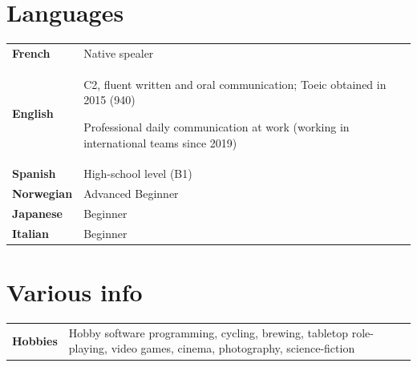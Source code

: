 \documentclass[11pt,a4paper]{article}
\newlength{\colone}
\newlength{\coltwo}
\begin{document}
\section{Languages}
\begin{longtable}{@{}p{\colone}p{\coltwo}@{}}
	\bfseries French	& Native spealer \\
	\bfseries English 	& C2, fluent written and oral communication; {\sc Toeic} obtained in 2015 (940) \par
		Professional daily communication at work (working in international teams since 2019) \\
	\bfseries Spanish 	& High-school level (B1) \\
	\bfseries Norwegian & Advanced Beginner \\
	\bfseries Japanese 	& Beginner \\
	\bfseries Italian 	& Beginner \\
\end{longtable}


\section{Various info}
\begin{longtable}{@{}p{\colone}p{\coltwo}@{}}
	\bfseries Hobbies
		& Hobby software programming, cycling, brewing, tabletop role-playing, video games, cinema, photography, science-fiction
\end{longtable}
\end{document}
